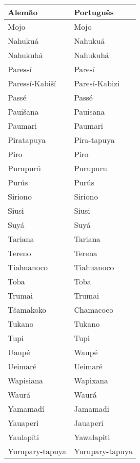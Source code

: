 \pagebreak

\begin{center}
\begin{tabular}{ | m{11em} | m{4.2cm}| } 
\hline
\textbf{Alemão} & \textbf{Português} \\ [0.5ex] 
\hline\hline
Mojo              	       	& Mojo \\
\hline
Nahukuá           	       	& Nahukuá \\
\hline
Nahukuhá          	       	& Nahukuhá \\
\hline
Paressí           	       	& Paresí \\
\hline
Paressí-Kabiší    	       	& Paresí-Kabizi \\
\hline
Passé             	       	& Passé \\
\hline
Pauišana          	       	& Pauisana \\
\hline
Paumari           	       	& Paumari \\
\hline
Piratapuya        	       	& Pira-tapuya \\
\hline
Piro              	       	& Piro \\
\hline
Purupurú          	       	& Purupuru \\
\hline
Purús             	       	& Purús \\
\hline
Siriono           	       	& Siriono \\
\hline
Siusi             	       	& Siusi \\
\hline
Suyá              	       	& Suyá \\
\hline
Tariana           	       	& Tariana \\
\hline
Tereno            	       	& Terena \\
\hline
Tiahuanoco        	       	& Tiahuanoco \\
\hline
Toba              	       	& Toba \\
\hline
Trumai            	       	& Trumai \\
\hline
Tšamakoko         	       	& Chamacoco \\
\hline
Tukano            	       	& Tukano \\
\hline
Tupi              	       	& Tupi \\
\hline
Uaupé             	       	& Waupé \\
\hline
Ueimaré           	       	& Ueimaré \\
\hline
Wapisiana         	       	& Wapixana \\
\hline
Waurá             	       	& Waurá \\
\hline
Yamamadí          	       	& Jamamadi \\
\hline
Yauaperí          	       	& Jauaperi \\
\hline
Yaulapíti         	       	& Yawalapiti \\
\hline
Yurupary-tapuya   	       	& Yurupary-tapuya\\
\hline
\end{tabular}
\end{center}